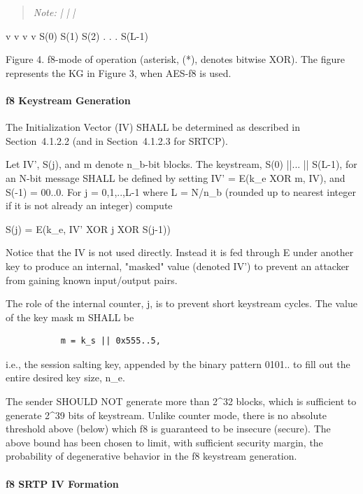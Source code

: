\documentclass{article}
\begin{document}
\begin{quote}
\textit{Note: |             |                  |}
\end{quote}

v           v             v                  v S(0)        S(1)          S(2)  . . .       S(L-1)

Figure 4.  f8-mode of operation (asterisk, (*), denotes bitwise XOR). The figure represents the KG in Figure 3, when AES-f8 is used.

\paragraph{f8 Keystream Generation}

The Initialization Vector (IV) SHALL be determined as described in Section~4.1.2.2 (and in Section~4.1.2.3 for SRTCP).

Let IV', S(j), and m denote n\_b-bit blocks.  The keystream, S(0) ||... || S(L-1), for an N-bit message SHALL be defined by setting IV' = E(k\_e XOR m, IV), and S(-1) = 00..0.  For j = 0,1,..,L-1 where L = N/n\_b (rounded up to nearest integer if it is not already an integer) compute

S(j) = E(k\_e, IV' XOR j XOR S(j-1))

Notice that the IV is not used directly.  Instead it is fed through E under another key to produce an internal, "masked" value (denoted IV') to prevent an attacker from gaining known input/output pairs.

The role of the internal counter, j, is to prevent short keystream cycles.  The value of the key mask m SHALL be

\begin{verbatim}
           m = k_s || 0x555..5,
\end{verbatim}

i.e., the session salting key, appended by the binary pattern 0101.. to fill out the entire desired key size, n\_e.

The sender SHOULD NOT generate more than 2\textasciicircum{}32 blocks, which is sufficient to generate 2\textasciicircum{}39 bits of keystream.  Unlike counter mode, there is no absolute threshold above (below) which f8 is guaranteed to be insecure (secure).  The above bound has been chosen to limit, with sufficient security margin, the probability of degenerative behavior in the f8 keystream generation.

\paragraph{f8 SRTP IV Formation}
\end{document}
